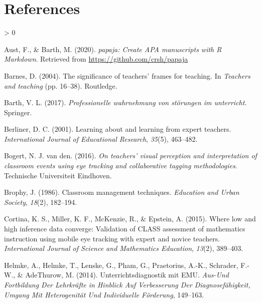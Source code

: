 \documentclass[
  english,
  man,floatsintext]{apa6}
\newlength{\cslhangindent}
\newenvironment{CSLReferences}[2] %
 {%
  \setlength{\parindent}{0pt}
  \ifodd #1 \everypar{\setlength{\hangindent}{\cslhangindent}}\ignorespaces\fi
  \ifnum #2 > 0
  \setlength{\parskip}{#2\baselineskip}
  \fi
 }%
 {}
\begin{document}
\newpage

\hypertarget{references}{%
\section{References}\label{references}}

\begingroup
\setlength{\parindent}{-0.5in}
\setlength{\leftskip}{0.5in}

\hypertarget{refs}{}
\begin{CSLReferences}{1}{0}
\leavevmode\hypertarget{ref-R-papaja}{}%
Aust, F., \& Barth, M. (2020). \emph{{papaja}: {Create} {APA} manuscripts with {R Markdown}}. Retrieved from \url{https://github.com/crsh/papaja}

\leavevmode\hypertarget{ref-barnes2004significance}{}%
Barnes, D. (2004). The significance of teachers' frames for teaching. In \emph{Teachers and teaching} (pp. 16--38). Routledge.

\leavevmode\hypertarget{ref-barth2017professionelle}{}%
Barth, V. L. (2017). \emph{Professionelle wahrnehmung von störungen im unterricht}. Springer.

\leavevmode\hypertarget{ref-berliner2001learning}{}%
Berliner, D. C. (2001). Learning about and learning from expert teachers. \emph{International Journal of Educational Research}, \emph{35}(5), 463--482.

\leavevmode\hypertarget{ref-bogert2016visualperception}{}%
Bogert, N. J. van den. (2016). \emph{On teachers' visual perception and interpretation of classroom events using eye tracking and collaborative tagging methodologies}. Technische Universiteit Eindhoven.

\leavevmode\hypertarget{ref-brophy1986classroom}{}%
Brophy, J. (1986). Classroom management techniques. \emph{Education and Urban Society}, \emph{18}(2), 182--194.

\leavevmode\hypertarget{ref-cortina2015low}{}%
Cortina, K. S., Miller, K. F., McKenzie, R., \& Epstein, A. (2015). Where low and high inference data converge: Validation of CLASS assessment of mathematics instruction using mobile eye tracking with expert and novice teachers. \emph{International Journal of Science and Mathematics Education}, \emph{13}(2), 389--403.

\leavevmode\hypertarget{ref-helmke2014unterrichtsdiagnostik}{}%
Helmke, A., Helmke, T., Lenske, G., Pham, G., Praetorius, A.-K., Schrader, F.-W., \& AdeThurow, M. (2014). Unterrichtsdiagnostik mit EMU. \emph{Aus-Und Fortbildung Der Lehrkr{ä}fte in Hinblick Auf Verbesserung Der Diagnosef{ä}higkeit, Umgang Mit Heterogenit{ä}t Und Individuelle F{ö}rderung}, 149--163.


\end{CSLReferences}
\end{document}
